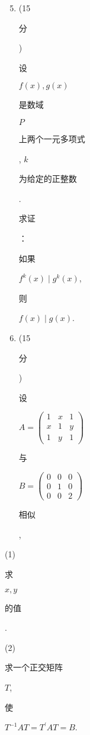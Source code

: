\documentclass[10pt]{article}
\begin{document}
\begin{enumerate}
  \setcounter{enumi}{4}
  \item (15 \begin{CJK}{UTF8}{mj}分\end{CJK}) \begin{CJK}{UTF8}{mj}设\end{CJK} $f(x), g(x)$ \begin{CJK}{UTF8}{mj}是数域\end{CJK} $P$ \begin{CJK}{UTF8}{mj}上两个一元多项式\end{CJK}, $k$ \begin{CJK}{UTF8}{mj}为给定的正整数\end{CJK}. \begin{CJK}{UTF8}{mj}求证\end{CJK}：\begin{CJK}{UTF8}{mj}如果\end{CJK} $f^{k}(x) \mid g^{k}(x)$, \begin{CJK}{UTF8}{mj}则\end{CJK} $f(x) \mid g(x)$.

  \item (15 \begin{CJK}{UTF8}{mj}分\end{CJK}) \begin{CJK}{UTF8}{mj}设\end{CJK} $A=\left(\begin{array}{lll}1 & x & 1 \\ x & 1 & y \\ 1 & y & 1\end{array}\right)$ \begin{CJK}{UTF8}{mj}与\end{CJK} $B=\left(\begin{array}{lll}0 & 0 & 0 \\ 0 & 1 & 0 \\ 0 & 0 & 2\end{array}\right)$ \begin{CJK}{UTF8}{mj}相似\end{CJK},

\end{enumerate}
(1) \begin{CJK}{UTF8}{mj}求\end{CJK} $x, y$ \begin{CJK}{UTF8}{mj}的值\end{CJK}.

(2) \begin{CJK}{UTF8}{mj}求一个正交矩阵\end{CJK} $T$, \begin{CJK}{UTF8}{mj}使\end{CJK} $T^{-1} A T=T^{\prime} A T=B$.
\end{document}
